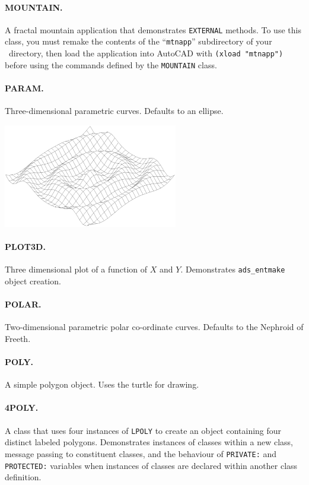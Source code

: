\documentclass{article}
\begin{document}
\paragraph{MOUNTAIN.}  A fractal mountain application that demonstrates
                {\tt EXTERNAL} methods.  To use this class, you must
                remake the contents of the ``{\tt mtnapp}''
                subdirectory of your \cw\ directory, then load the
                application into AutoCAD with \verb+(xload "mtnapp")+
                before using the commands defined by the {\tt MOUNTAIN}
                class.

\paragraph{PARAM.}  Three-dimensional parametric curves.
                    Defaults to an ellipse.

\centerline{\includegraphics[width=3in]{cwfig10.eps}}
\paragraph{PLOT3D.}  Three dimensional plot of a function of $X$ and $Y$\@.
                Demonstrates \verb+ads_entmake+ object
                creation.

\paragraph{POLAR.}  Two-dimensional parametric polar co-ordinate curves.
                Defaults to the Nephroid of Freeth.

\paragraph{POLY.}  A simple polygon object.  Uses the turtle for
                drawing.

\paragraph{4POLY.}  A class that uses four instances of {\tt LPOLY} to create
                an object containing four distinct labeled polygons.
                Demonstrates instances of classes within a new class,
                message passing to constituent classes, and the
                behaviour of {\tt PRIVATE:} and {\tt PROTECTED:}
                variables when instances of classes are declared
                within another class definition.
\end{document}
